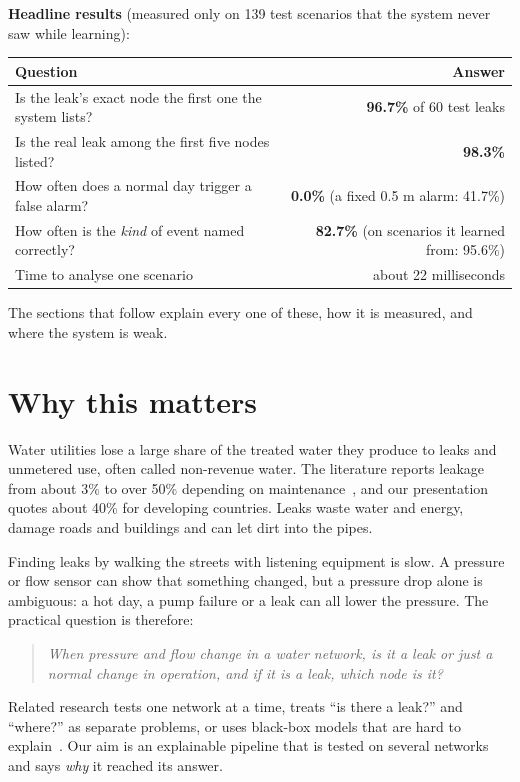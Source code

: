 \documentclass[11pt,a4paper]{article}
\begin{document}
\textbf{Headline results} (measured only on 139 test scenarios that the system never saw while learning):
\begin{center}\begin{tabular}{@{}lr@{}}\toprule
Question & Answer \\\midrule
Is the leak's exact node the first one the system lists? & \textbf{96.7\%} of 60 test leaks \\
Is the real leak among the first five nodes listed? & \textbf{98.3\%} \\
How often does a normal day trigger a false alarm? & \textbf{0.0\%} (a fixed 0.5 m alarm: 41.7\%) \\
How often is the \emph{kind} of event named correctly? & \textbf{82.7\%} (on scenarios it learned from: 95.6\%) \\
Time to analyse one scenario & about 22 milliseconds \\\bottomrule\end{tabular}\end{center}
The sections that follow explain every one of these, how it is measured, and where the system is weak.

\section{Why this matters}
Water utilities lose a large share of the treated water they produce to leaks and unmetered use, often called non-revenue water. The literature reports leakage from about 3\% to over 50\% depending on maintenance~\cite{sousa2026review}, and our presentation quotes about 40\% for developing countries. Leaks waste water and energy, damage roads and buildings and can let dirt into the pipes.

Finding leaks by walking the streets with listening equipment is slow. A pressure or flow sensor can show that something changed, but a pressure drop alone is ambiguous: a hot day, a pump failure or a leak can all lower the pressure. The practical question is therefore:

\begin{quote}\itshape When pressure and flow change in a water network, is it a leak or just a normal change in operation, and if it is a leak, which node is it?\end{quote}

Related research tests one network at a time, treats ``is there a leak?'' and ``where?'' as separate problems, or uses black-box models that are hard to explain~\cite{soldevila2021hybrid,sun2020leak,leonzio2026centrality,zhang2026aignn}. Our aim is an explainable pipeline that is tested on several networks and says \emph{why} it reached its answer.
\end{document}
